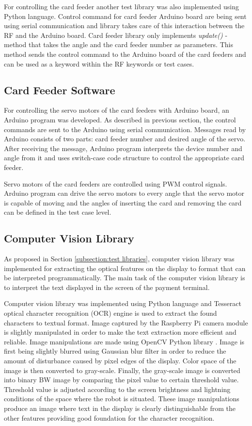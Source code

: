 For controlling the card feeder another test library was also implemented using Python language. Control command for card feeder Arduino board are being sent using serial communication and library takes care of this interaction between the RF and the Arduino board. Card feeder library only implements \emph{update()} -method that takes the angle and the card feeder number as parameters. This method sends the control command to the Arduino board of the card feeders and can be used as a keyword within the RF keywords or test cases.

\subsection{Card Feeder Software}
\label{subsection:card feeder software}

For controlling the servo motors of the card feeders with Arduino board, an Arduino program was developed. As described in previous section, the control commands are sent to the Arduino using serial communication. Messages read by Arduino consists of two parts: card feeder number and desired angle of the servo. After receiving the message, Arduino program interprets the device number and angle from it and uses switch-case code structure to control the appropriate card feeder. 

Servo motors of the card feeders are controlled using PWM control signals. Arduino program can drive the servo motors to every angle that the servo motor is capable of moving and the angles of inserting the card and removing the card can be defined in the test case level.

\subsection{Computer Vision Library}
\label{subsection:Computer vision library}

As proposed in Section \ref{subsection:test libraries}, computer vision library was implemented for extracting the optical features on the display to format that can be interpreted programmatically. The main task of the computer vision library is to interpret the text displayed in the screen of the payment terminal.

Computer vision library was implemented using Python language and Tesseract optical character recognition (OCR) engine is used to extract the found characters to textual format. Image captured by the Raspberry Pi camera module is slightly manipulated in order to make the text extraction more efficient and reliable. Image manipulations are made using OpenCV Python library \emph{\citep{opencv}}. Image is first being slightly blurred using Gaussian blur filter in order to reduce the amount of disturbance caused by pixel edges of the display. Color space of the image is then converted to gray-scale. Finally, the gray-scale image is converted into binary BW image by comparing the pixel value to certain threshold value. Threshold value is adjusted according to the screen brightness and lightning conditions of the space where the robot is situated. These image manipulations produce an image where text in the display is clearly distinguishable from the other features providing good foundation for the character recognition.

